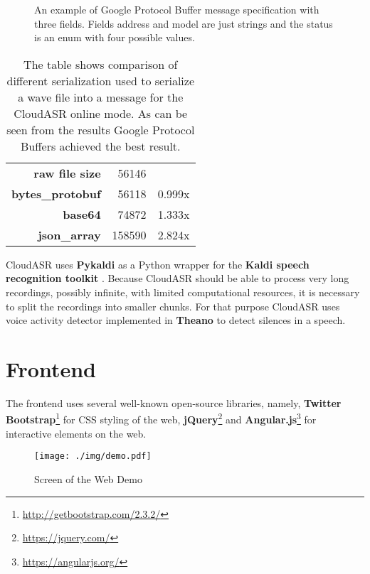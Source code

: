 \begin{figure}[h]
  

  \caption{
    An example of Google Protocol Buffer message specification with three fields.
    Fields address and model are just strings and the status is an enum with four possible values.
  }
  \label{fig:protobuf}
\end{figure}

\begin{table}[h]
  \begin{tabular}{rrl}
  \textbf{raw file size} & 56146 & \\
  \cline{1-3}
  \textbf{bytes\_protobuf} & 56118 & 0.999x \\
  \textbf{base64} & 74872 & 1.333x \\
  \textbf{json\_array} & 158590 & 2.824x \\
  \end{tabular}

  \caption{
    The table shows comparison of different serialization used to serialize a wave file into a message for the CloudASR online mode.
    As can be seen from the results Google Protocol Buffers achieved the best result.
  }
  \label{fig:protobuf-benchmark}
\end{table}

CloudASR uses \textbf{Pykaldi} \cite{platek2014free} as a Python wrapper for the \textbf{Kaldi speech recognition toolkit} \cite{povey2011kaldi}.
Because CloudASR should be able to process very long recordings, possibly infinite,
  with limited computational resources,
  it is necessary to split the recordings into smaller chunks.
For that purpose CloudASR uses voice activity detector implemented in \textbf{Theano} \cite{bergstra2010theano} to detect silences in a speech.


\section{Frontend}
The frontend uses several well-known open-source libraries, namely,
  \textbf{Twitter Bootstrap}\footnote{\url{http://getbootstrap.com/2.3.2/}} for CSS styling of the web,
  \textbf{jQuery}\footnote{\url{https://jquery.com/}}
  and \textbf{Angular.js}\footnote{\url{https://angularjs.org/}} for interactive elements on the web.

\begin{figure}[h]
  \centering
  \texttt{[image: ./img/demo.pdf]}

  \caption{Screen of the Web Demo}
  \label{fig:demo}
\end{figure}

